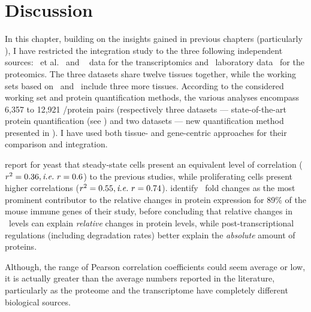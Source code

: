 \section{Discussion}

In this chapter,
building on the insights gained in previous chapters
(particularly ),
I have restricted the integration study to
the three following independent sources:
\uhlen\ et al.~
and \gtex~ data for the transcriptomics
and \pandey\ laboratory data~ for the proteomics.
The three datasets share twelve tissues together,
while the working sets based on \uhlen\ and \pandey\ include three more tissues.
According to the considered working set and protein quantification methods,
the various analyses encompass 6,357 to 12,921 \mRNA/protein pairs
(respectively
three datasets --- state-of-the-art protein quantification (see )
and two datasets --- new quantification method presented in ).
I have used both tissue- and gene-centric approaches
for their comparison and integration.\mybr\









\citet{Marguerat2012-sn} report for yeast that
steady-state cells present an equivalent level of correlation ($r^2=0.36,
\textit{i.e.}~r=0.6$) to the previous studies,
while proliferating cells present higher correlations ($r^2=0.55, \textit{i.e.}~r=0.74$).
\citet{Jovanovic2015-wv} identify \mRNA\ fold changes
as the most prominent contributor to the relative changes in protein expression
for 89\% of the mouse immune genes of their study,
before concluding that relative changes in \mRNAs\ levels can explain
\emph{relative} changes in protein levels,
while post-transcriptional regulations (including degradation rates)
better explain the \emph{absolute} amount of proteins.




Although, the range of Pearson correlation coefficients could seem average or
low, it is actually greater than the average numbers reported in the literature,
particularly as the proteome and the transcriptome have completely different
biological sources.


